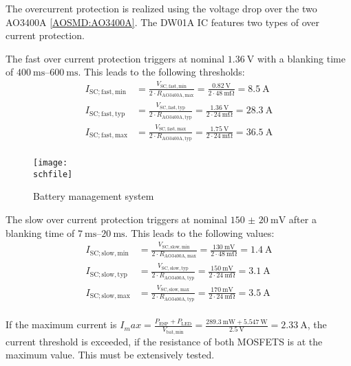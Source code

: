 The overcurrent protection is realized using the voltage drop over the two AO3400A \ref{AOSMD:AO3400A}. The DW01A IC features two types of over current protection. 

The fast over current protection triggers at nominal $\SI{1.36}{\V}$ with a blanking time of $\qtyrange{400}{600}{\ms}$. This leads to the following thresholds: 
\begin{align}
	I_\mathrm{SC;fast,min} &= \frac{V_\mathrm{SC,fast,min}}{2\cdot R_\mathrm{AO3400A,max}}=\frac{\SI{0.82}{\V}}{2\cdot\SI{48}{\milli\ohm}}=\SI{8.5}{\A}\\
		I_\mathrm{SC;fast,typ} &= \frac{V_\mathrm{SC,fast,typ}}{2\cdot R_\mathrm{AO3400A,typ}}=\frac{\SI{1.36}{\V}}{2\cdot\SI{24}{\milli\ohm}}=\SI{28.3}{\A}\\
		I_\mathrm{SC;fast,max} &= \frac{V_\mathrm{SC,fast,max}}{2\cdot R_\mathrm{AO3400A,typ}}=\frac{\SI{1.75}{\V}}{2\cdot\SI{24}{\milli\ohm}}=\SI{36.5}{\A}\\
\end{align}


\begin{figure}[h!]
    \centering
    \texttt{[image: \\schfile]}
    \caption{Battery management system}
    \label{fig_bms}
\end{figure}

The slow over current protection triggers at nominal $\SI{150(20)}{\milli\V}$ after a blanking time of $\qtyrange{7}{20}{\ms}$. This leads to the following values: 
\begin{align}
	I_\mathrm{SC;slow,min} &= \frac{V_\mathrm{SC,slow,min}}{2\cdot R_\mathrm{AO3400A,max}}=\frac{\SI{130}{\milli\V}}{2\cdot\SI{48}{\milli\ohm}}=\SI{1.4}{\A}\\
		I_\mathrm{SC;slow,typ} &= \frac{V_\mathrm{SC,slow,typ}}{2\cdot R_\mathrm{AO3400A,typ}}=\frac{\SI{150}{\milli\V}}{2\cdot\SI{24}{\milli\ohm}}=\SI{3.1}{\A}\\
		I_\mathrm{SC;slow,max} &= \frac{V_\mathrm{SC,slow,max}}{2\cdot R_\mathrm{AO3400A,typ}}=\frac{\SI{170}{\milli\V}}{2\cdot\SI{24}{\milli\ohm}}=\SI{3.5}{\A}\\
\end{align}

If the maximum current is $I_max=\frac{P_\mathrm{ESP}+P_\mathrm{LED}}{V_\mathrm{bat,min}}=\frac{\SI{289.3}{\milli\W} + \SI{5.547}{\W}}{\SI{2.5}{\V}}=\SI{2.33}{\A}$, the current threshold is exceeded, if the resistance of both MOSFETS is at the maximum value. This must be extensively tested. 

